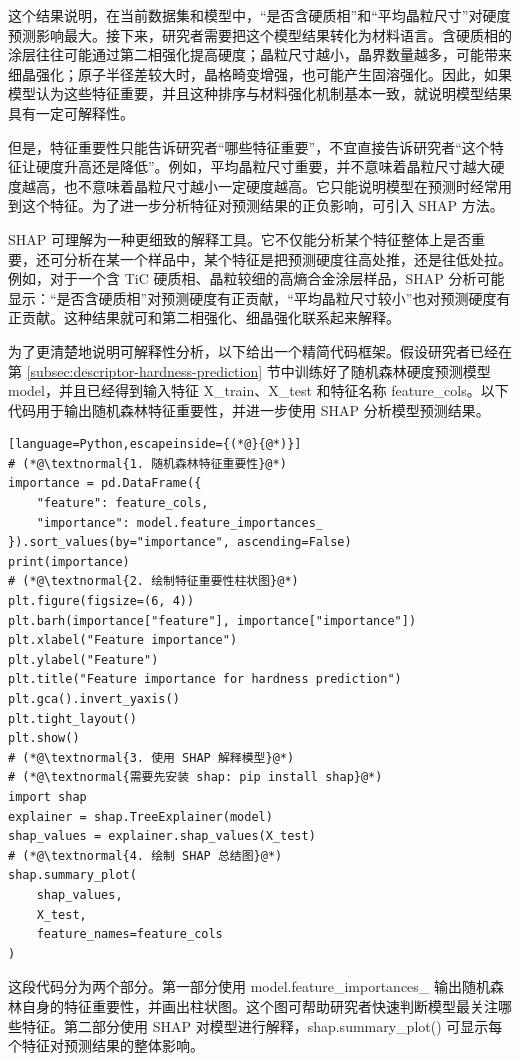 这个结果说明，在当前数据集和模型中，“是否含硬质相”和“平均晶粒尺寸”对硬度预测影响最大。接下来，研究者需要把这个模型结果转化为材料语言。含硬质相的涂层往往可能通过第二相强化提高硬度；晶粒尺寸越小，晶界数量越多，可能带来细晶强化；原子半径差较大时，晶格畸变增强，也可能产生固溶强化。因此，如果模型认为这些特征重要，并且这种排序与材料强化机制基本一致，就说明模型结果具有一定可解释性。


但是，特征重要性只能告诉研究者“哪些特征重要”，不宜直接告诉研究者“这个特征让硬度升高还是降低”。例如，平均晶粒尺寸重要，并不意味着晶粒尺寸越大硬度越高，也不意味着晶粒尺寸越小一定硬度越高。它只能说明模型在预测时经常用到这个特征。为了进一步分析特征对预测结果的正负影响，可引入 SHAP 方法。


SHAP 可理解为一种更细致的解释工具。它不仅能分析某个特征整体上是否重要，还可分析在某一个样品中，某个特征是把预测硬度往高处推，还是往低处拉。例如，对于一个含 TiC 硬质相、晶粒较细的高熵合金涂层样品，SHAP 分析可能显示：“是否含硬质相”对预测硬度有正贡献，“平均晶粒尺寸较小”也对预测硬度有正贡献。这种结果就可和第二相强化、细晶强化联系起来解释。


为了更清楚地说明可解释性分析，以下给出一个精简代码框架。假设研究者已经在第 \ref{subsec:descriptor-hardness-prediction} 节中训练好了随机森林硬度预测模型 model，并且已经得到输入特征 X\_\allowbreak{}train、X\_\allowbreak{}test 和特征名称 feature\_\allowbreak{}cols。以下代码用于输出随机森林特征重要性，并进一步使用 SHAP 分析模型预测结果。


\begin{lstlisting}[language=Python,escapeinside={(*@}{@*)}]
# (*@\textnormal{1. 随机森林特征重要性}@*)
importance = pd.DataFrame({
    "feature": feature_cols,
    "importance": model.feature_importances_
}).sort_values(by="importance", ascending=False)
print(importance)
# (*@\textnormal{2. 绘制特征重要性柱状图}@*)
plt.figure(figsize=(6, 4))
plt.barh(importance["feature"], importance["importance"])
plt.xlabel("Feature importance")
plt.ylabel("Feature")
plt.title("Feature importance for hardness prediction")
plt.gca().invert_yaxis()
plt.tight_layout()
plt.show()
# (*@\textnormal{3. 使用 SHAP 解释模型}@*)
# (*@\textnormal{需要先安装 shap: pip install shap}@*)
import shap
explainer = shap.TreeExplainer(model)
shap_values = explainer.shap_values(X_test)
# (*@\textnormal{4. 绘制 SHAP 总结图}@*)
shap.summary_plot(
    shap_values,
    X_test,
    feature_names=feature_cols
)
\end{lstlisting}

这段代码分为两个部分。第一部分使用 model.feature\_\allowbreak{}importances\_\allowbreak{} 输出随机森林自身的特征重要性，并画出柱状图。这个图可帮助研究者快速判断模型最关注哪些特征。第二部分使用 SHAP 对模型进行解释，shap.summary\_\allowbreak{}plot() 可显示每个特征对预测结果的整体影响。


